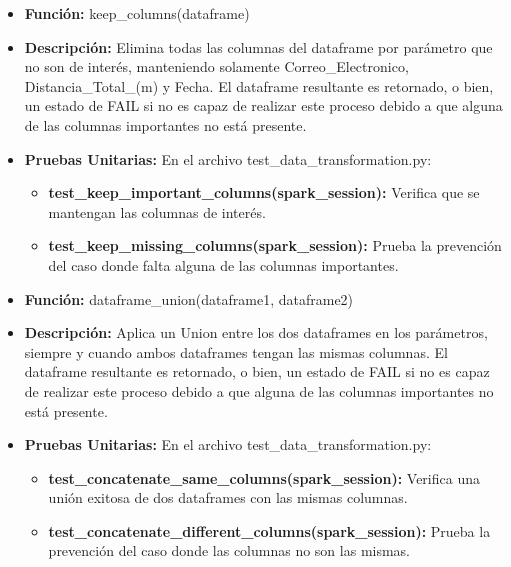 \documentclass[a4paper]{article}
\begin{document}
\begin{itemize}
        \begin{itemize}
            \item \textbf{Funci\'{o}n:} keep\_columns(dataframe)
            \item \textbf{Descripci\'{o}n:} Elimina todas las columnas del dataframe por par\'{a}metro que no son de inter\'{e}s, manteniendo solamente  Correo\_Electronico, Distancia\_Total\_(m) y Fecha. El dataframe resultante es retornado, o bien, un estado de FAIL si no es capaz de realizar este proceso debido a que alguna de las columnas importantes no est\'{a} presente.
            \item \textbf{Pruebas Unitarias:} En el archivo test\_data\_transformation.py:
                \begin{itemize}
                    \item \textbf{test\_keep\_important\_columns(spark\_session):} Verifica que se mantengan las columnas de inter\'{e}s.
                    \item \textbf{test\_keep\_missing\_columns(spark\_session):} Prueba la prevenci\'{o}n del caso donde falta alguna de las columnas importantes.
                \end{itemize}
        \end{itemize}

        \begin{itemize}
            \item \textbf{Funci\'{o}n:} dataframe\_union(dataframe1, dataframe2)
            \item \textbf{Descripci\'{o}n:} Aplica un Union entre los dos dataframes en los par\'{a}metros, siempre y cuando ambos dataframes tengan las mismas columnas. El dataframe resultante es retornado, o bien, un estado de FAIL si no es capaz de realizar este proceso debido a que alguna de las columnas importantes no est\'{a} presente.
            \item \textbf{Pruebas Unitarias:} En el archivo test\_data\_transformation.py:
                \begin{itemize}
                    \item \textbf{test\_concatenate\_same\_columns(spark\_session):} Verifica una uni\'{o}n exitosa de dos dataframes con las mismas columnas.
                    \item \textbf{test\_concatenate\_different\_columns(spark\_session):} Prueba la prevenci\'{o}n del caso donde las columnas no son las mismas.
                \end{itemize}
        \end{itemize}


\end{itemize}
\end{document}
